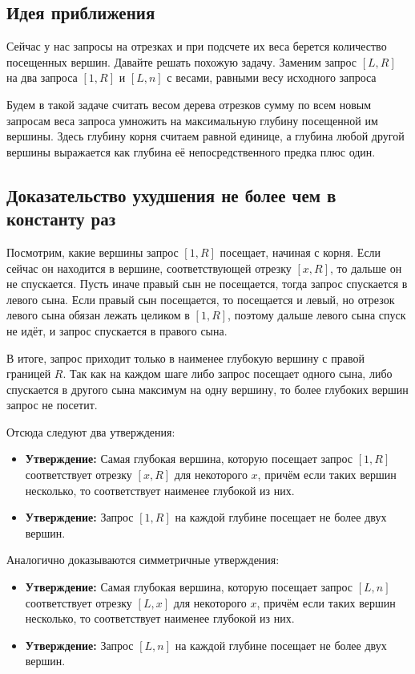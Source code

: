 \subsection{Идея приближения}

Сейчас у нас запросы на отрезках и при подсчете их веса берется количество посещенных вершин. Давайте решать похожую задачу. Заменим запрос $[L, R]$ на два запроса $[1, R]$ и $[L, n]$ с весами, равными весу исходного запроса

Будем в такой задаче считать весом дерева отрезков сумму по всем новым запросам веса запроса умножить на максимальную глубину посещенной им вершины.
Здесь глубину корня считаем равной единице, а глубина любой другой вершины выражается как глубина её непосредственного предка плюс один.

\subsection{Доказательство ухудшения не более чем в константу раз}

Посмотрим, какие вершины запрос $[1, R]$ посещает, начиная с корня. Если сейчас он находится в вершине, соответствующей отрезку $[x, R]$, то дальше он не спускается. Пусть иначе правый сын не посещается, тогда запрос спускается в левого сына. Если правый сын посещается, то посещается и левый, но отрезок левого сына обязан лежать целиком в $[1, R]$, поэтому дальше левого сына спуск не идёт, и запрос спускается в правого сына.

В итоге, запрос приходит только в наименее глубокую вершину с правой границей $R$. Так как на каждом шаге либо запрос посещает одного сына, либо спускается в другого сына максимум на одну вершину, то более глубоких вершин запрос не посетит.

Отсюда следуют два утверждения:

\begin{itemize}
    \item \textbf{Утверждение:} Самая глубокая вершина, которую посещает запрос $[1, R]$ соответствует отрезку $[x, R]$ для некоторого $x$, причём если таких вершин несколько, то соответствует наименее глубокой из них.
    \item \textbf{Утверждение:} Запрос $[1, R]$ на каждой глубине посещает не более двух вершин.
\end{itemize}

Аналогично доказываются симметричные утверждения:

\begin{itemize}
    \item \textbf{Утверждение:} Самая глубокая вершина, которую посещает запрос $[L, n]$ соответствует отрезку $[L, x]$ для некоторого $x$, причём если таких вершин несколько, то соответствует наименее глубокой из них.
    \item \textbf{Утверждение:} Запрос $[L, n]$ на каждой глубине посещает не более двух вершин.
\end{itemize}

